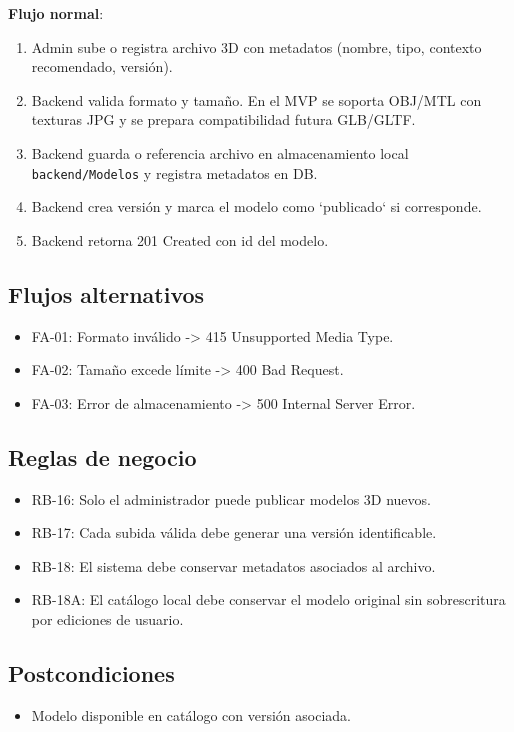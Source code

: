 \documentclass[12pt,a4paper]{article}
\begin{document}
\vspace{0.5em}
\textbf{Flujo normal}:
\begin{enumerate}[leftmargin=*]
    \item Admin sube o registra archivo 3D con metadatos (nombre, tipo, contexto recomendado, versi\'on).
    \item Backend valida formato y tama\~no. En el MVP se soporta OBJ/MTL con texturas JPG y se prepara compatibilidad futura GLB/GLTF.
    \item Backend guarda o referencia archivo en almacenamiento local \texttt{backend/Modelos} y registra metadatos en DB.
    \item Backend crea versi\'on y marca el modelo como `publicado` si corresponde.
    \item Backend retorna 201 Created con id del modelo.
\end{enumerate}

\subsection*{Flujos alternativos}
\begin{itemize}[leftmargin=*]
    \item FA-01: Formato inv\'alido -> 415 Unsupported Media Type.
    \item FA-02: Tama\~no excede l\'imite -> 400 Bad Request.
    \item FA-03: Error de almacenamiento -> 500 Internal Server Error.
\end{itemize}

\subsection*{Reglas de negocio}
\begin{itemize}[leftmargin=*]
    \item RB-16: Solo el administrador puede publicar modelos 3D nuevos.
    \item RB-17: Cada subida v\'alida debe generar una versi\'on identificable.
    \item RB-18: El sistema debe conservar metadatos asociados al archivo.
    \item RB-18A: El cat\'alogo local debe conservar el modelo original sin sobrescritura por ediciones de usuario.
\end{itemize}

\subsection*{Postcondiciones}
\begin{itemize}[leftmargin=*]
    \item Modelo disponible en cat\'alogo con versi\'on asociada.
\end{itemize}
\end{document}
